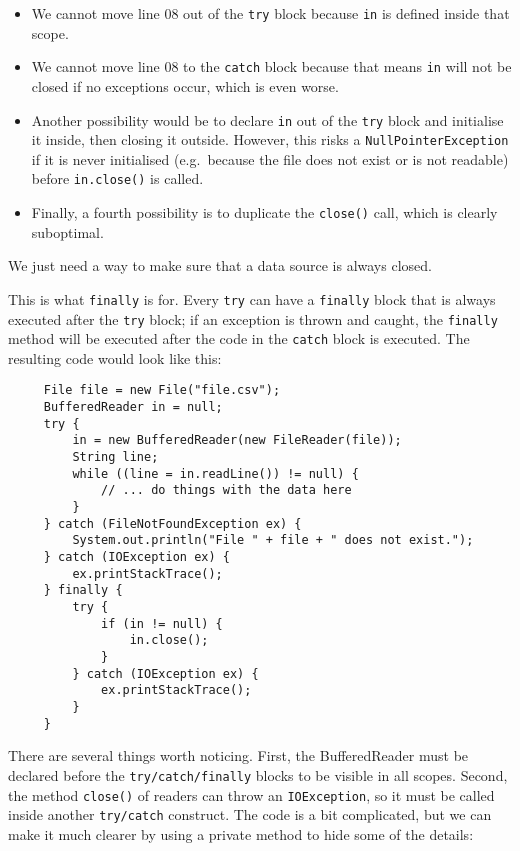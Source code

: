 \begin{itemize}
\item We cannot move 
  line 08 out of the \verb+try+ block because
  \verb+in+ is defined inside that scope.
\item We cannot move 
  line 08 to the \verb+catch+ block because that means
  \verb+in+ will not be closed if no exceptions occur, which is even
  worse. 
\item Another possibility would be to declare \verb+in+ out of the
  \verb+try+ block and initialise it inside, then closing it
  outside. However, this risks a \verb+NullPointerException+ if it is
  never initialised (e.g.~because the file does not exist or is not
  readable) before \verb+in.close()+ is called. 
\item Finally, a fourth possibility is to duplicate the \verb+close()+
  call, which is clearly suboptimal.
\end{itemize}

We just need a way to make sure that a data source is always closed. 

This is what \verb+finally+ is for. Every \verb+try+ can have a
\verb+finally+ block that is always executed after the \verb+try+
block; if an exception is thrown and caught, the \verb+finally+
method will be executed after the code in the \verb+catch+ block is
executed. The resulting code would look like this: 

\label{code:basic-reading-example-with-finally}
\begin{verbatim}
     File file = new File("file.csv");
     BufferedReader in = null;
     try {
         in = new BufferedReader(new FileReader(file)); 
         String line;
         while ((line = in.readLine()) != null) {
             // ... do things with the data here
         }
     } catch (FileNotFoundException ex) {
         System.out.println("File " + file + " does not exist.");
     } catch (IOException ex) {
         ex.printStackTrace();
     } finally { 
         try {
             if (in != null) {
                 in.close();
             }
         } catch (IOException ex) {
             ex.printStackTrace();
         }
     }
\end{verbatim}

There are several things worth noticing. First, the BufferedReader
must be declared before the \verb+try/catch/finally+ blocks to be
visible in all scopes. Second, the method \verb+close()+ of readers
can throw an \verb+IOException+, so it must be called inside another
\verb+try/catch+ construct. The code is a bit complicated, but we can
make it much clearer by using a private method to hide some of the
details: 

